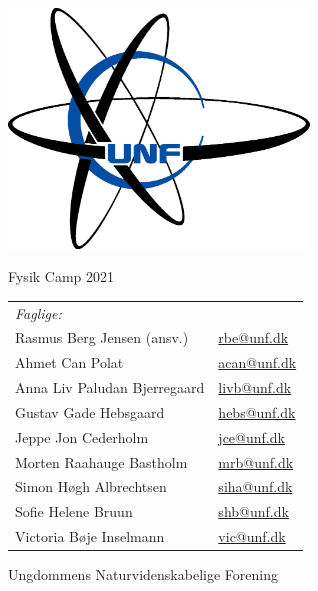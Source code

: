 \newcommand{\campyear}{2021}%
\frontmatter
{}%

\begin{center}
\includegraphics[width = 8cm]{setup/Unflogo.eps}
\vspace{1cm}

{\fontsize{24pt}{28pt}\selectfont
Fysik Camp \campyear}

\vspace{3cm}
\begin{tabular}{ll}
      \textit{Faglige:} & \\
      Rasmus Berg Jensen (ansv.)	    & \href{mailto:rbe@unf.dk}{rbe@unf.dk} \\
      Ahmet Can Polat		            & \href{mailto:acan@unf.dk}{acan@unf.dk} \\
      Anna Liv Paludan Bjerregaard		& \href{mailto:liv@unf.dk}{livb@unf.dk} \\
      Gustav Gade Hebsgaard		        & \href{mailto:hebs@unf.dk}{hebs@unf.dk} \\
      Jeppe Jon Cederholm		        & \href{mailto:jce@unf.dk}{jce@unf.dk} \\
      Morten Raahauge Bastholm		    & \href{mailto:mrb@unf.dk}{mrb@unf.dk} \\
      Simon Høgh Albrechtsen	    	& \href{mailto:siha@unf.dk}{siha@unf.dk} \\
      Sofie Helene Bruun		    	& \href{mailto:shb@unf.dk}{shb@unf.dk} \\
      Victoria Bøje Inselmann	    	& \href{mailto:vic@unf.dk}{vic@unf.dk}
    \end{tabular}

\vfill
{\fontsize{16pt}{28pt}\selectfont
Ungdommens Naturvidenskabelige Forening}
\end{center}
\newpage
\hspace{1cm}%
\vfill

